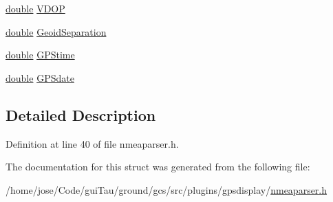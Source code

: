 \begin{DoxyCompactItemize}
\hyperlink{_super_l_u_support_8h_a8956b2b9f49bf918deed98379d159ca7}{double} \hyperlink{group___g_p_s_gadget_plugin_ga0c803c003d3d1261b1519a4b1f561ebe}{V\-D\-O\-P}
\item 
\hyperlink{_super_l_u_support_8h_a8956b2b9f49bf918deed98379d159ca7}{double} \hyperlink{group___g_p_s_gadget_plugin_ga847e7e6776a9a2cdaf8c4cf0ce8e31ae}{Geoid\-Separation}
\item 
\hyperlink{_super_l_u_support_8h_a8956b2b9f49bf918deed98379d159ca7}{double} \hyperlink{group___g_p_s_gadget_plugin_gaeedda11a0db9fe353ca149906deccb9f}{G\-P\-Stime}
\item 
\hyperlink{_super_l_u_support_8h_a8956b2b9f49bf918deed98379d159ca7}{double} \hyperlink{group___g_p_s_gadget_plugin_ga5556ea2f7e4f0fb213a319e72a5961eb}{G\-P\-Sdate}
\end{DoxyCompactItemize}


\subsection{Detailed Description}


Definition at line 40 of file nmeaparser.\-h.



The documentation for this struct was generated from the following file\-:\begin{DoxyCompactItemize}
\item 
/home/jose/\-Code/gui\-Tau/ground/gcs/src/plugins/gpsdisplay/\hyperlink{nmeaparser_8h}{nmeaparser.\-h}\end{DoxyCompactItemize}
